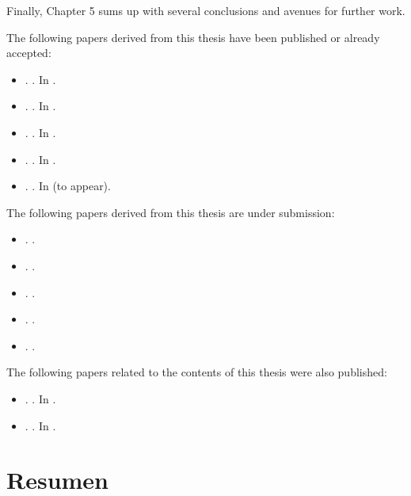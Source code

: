 \documentclass[a4paper, 11pt, openright, twoside]{reportPhD}
\numberwithin{figure}{chapter}
\numberwithin{table}{chapter}
\numberwithin{equation}{chapter}
\begin{document}
Finally, Chapter 5 sums up with several conclusions and avenues for further work.
\vspace{1cm}

The following papers derived from this thesis have been published or already accepted:
\begin{itemize}
    \item \cite{gallego2019dlms}. . In .
    \item \cite{gallego2019reinforcement}. . In .
     \item \cite{gallego2019vis}. . In .   
     \item \cite{math8111957}. . In .
     \item \cite{nn2022}. . In  (to appear).
\end{itemize}


The following papers derived from this thesis are under submission:
\begin{itemize}
    \item \citeauthor{gallego2019opponent}. . 
        \item \citeauthor{gallego2021data}. . 
    \item \citeauthor{gallego2018stochastic}. . 
    \item \citeauthor{AMLARA}. . 
     \item \citeauthor{gallego2020protecting}. . 
\end{itemize}

The following papers related to the contents of this thesis were also published:
\begin{itemize}
    \item \cite{angulo2018bayesian}. . In .
    \item \cite{banks2020adversarial}. . In .
\end{itemize}

\chapter*{Resumen}
\end{document}
